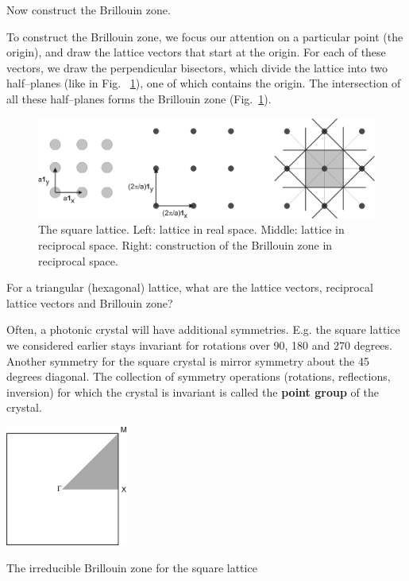 \begin{cue}
Now construct the Brillouin zone.
\end{cue}

To construct the Brillouin zone, we focus our attention on a particular point (the origin), and draw the lattice vectors that start at the origin. For each of these vectors, we draw the perpendicular bisectors, which divide the lattice into two half--planes (like in Fig.~ \ref{fig-bril-square}), one of which contains the origin. The intersection of all these half--planes forms the Brillouin zone (Fig.~\ref{fig-bril-square}).

\begin{figure}
\centering
\includegraphics{symmetry/figures/brillouin_square}
\caption{The square lattice. Left: lattice in real space. Middle: lattice in reciprocal space. Right: construction of the Brillouin zone in reciprocal space.}
\label{fig-bril-square}
\end{figure}


\begin{exer}
For a triangular (hexagonal) lattice, what are the lattice vectors, reciprocal lattice vectors and Brillouin zone?
\end{exer}

\pagebreak
 

Often, a photonic crystal will have additional symmetries. E.g. the square lattice we considered earlier stays invariant for rotations over 90, 180 and 270 degrees. Another symmetry for the square crystal is mirror symmetry about the 45 degrees diagonal. The collection of symmetry operations (rotations, reflections, inversion) for which the crystal is invariant is called the \textbf{point group} of the crystal.

\begin{marginfigure}
\centering
\includegraphics[width=4cm]{symmetry/figures/irred_bril}
\caption{The irreducible Brillouin zone for the square lattice}
\label{fig-irred-bril}
\end{marginfigure}

